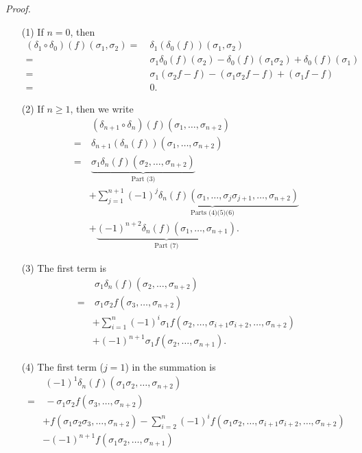 \documentclass{article}
\begin{document}
\emph{Proof.}
\begin{enumerate}
\item[(1)]
  If $n = 0$, then
  \begin{align*}
    (\delta_1 \circ \delta_0)(f)(\sigma_1,\sigma_2)
    = & \:
    \delta_1 (\delta_0(f))(\sigma_1,\sigma_2) \\
    = & \:
    \sigma_1 \delta_0(f)(\sigma_2)
        - \delta_0(f)(\sigma_1 \sigma_2)
        + \delta_0(f)(\sigma_1) \\
    = & \:
    \sigma_1 (\sigma_2 f - f)
        - (\sigma_1 \sigma_2 f - f)
        + (\sigma_1 f - f) \\
    = & \:
    0.
  \end{align*}

\item[(2)]
  If $n \geq 1$, then we write
  \begin{align*}
    & \:
    (\delta_{n+1} \circ \delta_n)(f)(\sigma_1,\ldots,\sigma_{n+2}) \\
    = & \:
    \delta_{n+1} (\delta_n(f))(\sigma_1,\ldots,\sigma_{n+2}) \\
    = & \:
    \underbrace{\sigma_1 \delta_n(f)(\sigma_2,\ldots,\sigma_{n+2})}_{\text{Part (3)}} \\
    & + \sum_{j=1}^{n+1}
        \underbrace{(-1)^{j}
        \delta_n(f)(\sigma_1, \ldots, \sigma_j \sigma_{j+1}, \ldots, \sigma_{n+2})}_{
            \text{Parts (4)(5)(6)}} \\
    & + \underbrace{(-1)^{n+2} \delta_n(f)(\sigma_1, \ldots, \sigma_{n+1})}_{\text{Part (7)}}.
  \end{align*}

\item[(3)]
  The first term is
  \begin{align*}
    & \:
    \sigma_1 \delta_n(f)(\sigma_2,\ldots,\sigma_{n+2}) \\
    = & \:
    \sigma_1 \sigma_2 f(\sigma_3, \ldots, \sigma_{n+2}) \\
    & + \sum_{i=1}^{n} (-1)^{i}
        \sigma_1 f(\sigma_2, \ldots, \sigma_{i+1} \sigma_{i+2}, \ldots, \sigma_{n+2}) \\
    & + (-1)^{n+1} \sigma_1 f(\sigma_2, \ldots, \sigma_{n+1}).
  \end{align*}

\item[(4)]
  The first term ($j = 1$) in the summation is
  \begin{align*}
    & \:
    (-1)^{1} \delta_n(f)(\sigma_1 \sigma_2, \ldots, \sigma_{n+2}) \\
    = & \:
    - \sigma_1\sigma_2 f(\sigma_3, \ldots, \sigma_{n+2}) \\
    & + f(\sigma_1\sigma_2\sigma_3, \ldots, \sigma_{n+2})
        - \sum_{i=2}^{n} (-1)^{i}
        f(\sigma_1\sigma_2, \ldots, \sigma_{i+1} \sigma_{i+2}, \ldots, \sigma_{n+2}) \\
    & - (-1)^{n+1} f(\sigma_1\sigma_2, \ldots, \sigma_{n+1})
  \end{align*}


\end{enumerate}
\end{document}
